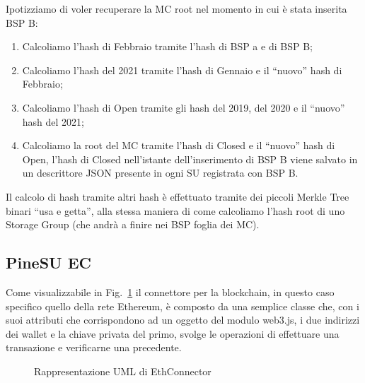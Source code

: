 Ipotizziamo di voler recuperare la MC root nel momento in cui è stata inserita BSP B:
\begin{enumerate}
    \item Calcoliamo l’hash di Febbraio tramite l’hash di BSP a e di BSP B;
    \item Calcoliamo l’hash del 2021 tramite l’hash di Gennaio e il “nuovo” hash di Febbraio;
    \item Calcoliamo l’hash di Open tramite gli hash del 2019, del 2020 e il “nuovo” hash del 2021;
    \item Calcoliamo la root del MC tramite l’hash di Closed e il “nuovo” hash di Open, l’hash di Closed nell’istante dell’inserimento di BSP B viene salvato in un descrittore JSON presente in ogni SU registrata con BSP B.
\end{enumerate}
Il calcolo di hash tramite altri hash è effettuato tramite dei piccoli Merkle Tree binari “usa e getta”, alla stessa maniera di come calcoliamo l’hash root di uno Storage Group (che andrà a finire nei BSP foglia dei MC).

\subsection{PineSU EC}

Come visualizzabile in Fig.~\ref{fi:umlEC} il connettore per la blockchain, in questo caso specifico quello della rete Ethereum, è composto da una semplice classe che, con i suoi attributi che corrispondono ad un oggetto del modulo \textsf{web3.js}, i due indirizzi dei wallet e la chiave privata del primo, svolge le operazioni di effettuare una transazione e verificarne una precedente.

\begin{figure}[H]
    \centering
    \caption{Rappresentazione UML di EthConnector}
    \label{fi:umlEC}
\end{figure}


